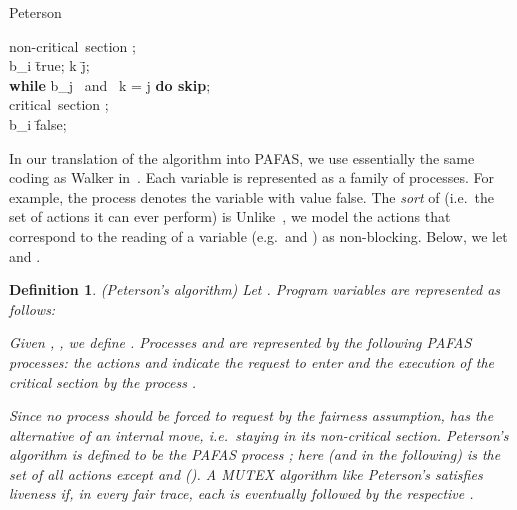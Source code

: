 \documentclass[copyright,creativecommons]{eptcs}
\newtheorem{definition}[theorem]{Definition}
\begin{document}
\vspace{0.2cm}
\small
\begin{algorithm}{Peterson}{}
\begin{WHILE}{}
\langle \mbox{non-critical section} \rangle; \\
b_i \= true; \quad k \= j;\\
{\bf while} \; b_j \mbox{ and } k = j \; {\bf do \; skip};\\
\langle \mbox{critical section} \rangle; \\
b_i \= false;
\end{WHILE}
\end{algorithm}
\normalsize
In our translation of the algorithm into PAFAS, we use essentially
the same coding as Walker in~\cite{Walker89}. Each variable is represented
as a family of processes. For example, the process  denotes the
variable  with value false. The {\em sort} of  (i.e.\ the
set of actions it can ever perform) is  Unlike~\cite{Walker89}, we model the actions that correspond to the reading
of a variable (e.g.\  and ) as non-blocking. Below, we
let  and .
\begin{definition}\label{pet-algo1}\rm({\sl Peterson's algorithm})
Let . Program variables are represented as follows:

\hspace{0.5cm}


\vspace{0.1cm}

\noindent
Given , , we define .
Processes  and  are represented by the following
PAFAS processes: the actions  and  indicate the request
to enter and the execution of the critical section by the process
.

\hspace{3cm}


\noindent
Since no process should be forced to request by the fairness assumption,
 has the alternative of an internal move, i.e.\ staying in its
non-critical section.
Peterson's algorithm is defined to be the PAFAS process ; here (and in
the following)  is the set of all actions except  and 
(). A MUTEX algorithm like Peterson's satisfies {\em liveness} if,
in every fair trace, each  is eventually followed by the respective
.
\end{definition}
\end{document}
